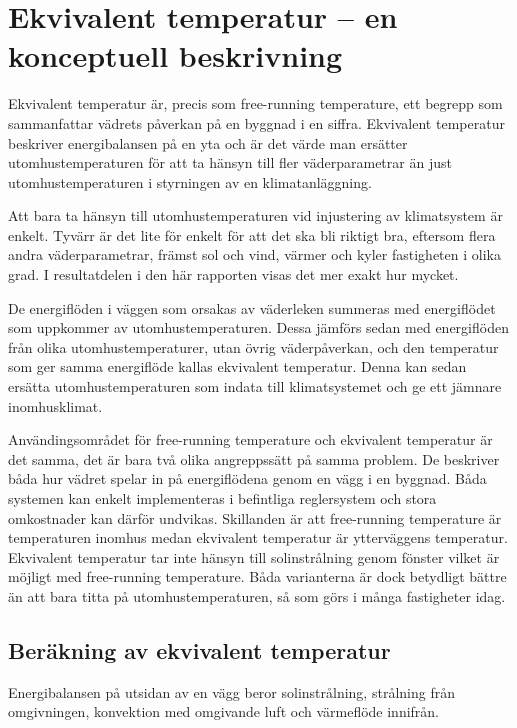\section{Ekvivalent temperatur  – en konceptuell beskrivning}
\label{sec:ekv_temp}

Ekvivalent temperatur är, precis som free-running temperature, ett begrepp som sammanfattar vädrets påverkan på en byggnad i en siffra. Ekvivalent temperatur beskriver energibalansen på en yta och är det värde man ersätter utomhustemperaturen för att ta 
hänsyn till fler väderparametrar än just utomhustemperaturen i styrningen av en 
klimatanläggning.

Att bara ta hänsyn till utomhustemperaturen vid injustering av klimatsystem är enkelt. 
Tyvärr är det lite för enkelt för att det ska bli riktigt bra, eftersom flera andra 
väderparametrar, främst sol och vind, värmer och kyler fastigheten i olika grad. I resultatdelen i den här rapporten visas det mer exakt hur mycket.

De energiflöden i väggen som orsakas av väderleken summeras med energiflödet 
som uppkommer av utomhustemperaturen. Dessa jämförs sedan med energiflöden från 
olika utomhustemperaturer, utan övrig väderpåverkan, och den temperatur som ger 
samma energiflöde kallas ekvivalent temperatur. Denna kan sedan ersätta 
utomhustemperaturen som indata till klimatsystemet och ge ett jämnare inomhusklimat. 

Användingsområdet för free-running temperature och ekvivalent temperatur är det samma, det är bara två olika angreppssätt på samma problem. De beskriver båda hur vädret spelar in på energiflödena genom en vägg i en byggnad.  Båda systemen kan enkelt implementeras i befintliga reglersystem och stora omkostnader kan därför undvikas. Skillanden är att free-running temperature är temperaturen inomhus medan ekvivalent temperatur är ytterväggens temperatur. Ekvivalent temperatur tar inte hänsyn till solinstrålning genom fönster vilket är möjligt med free-running temperature. Båda varianterna är dock betydligt bättre än att bara titta på utomhustemperaturen, så som görs i många fastigheter idag.

\subsection{Beräkning av ekvivalent temperatur}

Energibalansen på utsidan av en vägg beror solinstrålning, strålning från omgivningen, konvektion med omgivande luft och värmeflöde innifrån.

